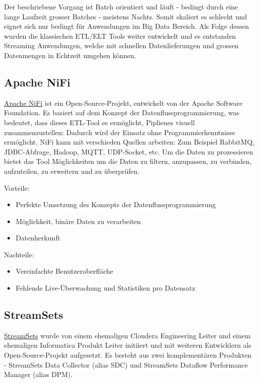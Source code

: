 Der beschriebene Vorgang ist Batch orientiert und l{\"a}uft - bedingt durch eine lange Laufzeit grosser Batches - meistens Nachts. Somit skaliert es schlecht und eignet sich nur bedingt f{\"u}r Anwendungen im Big Data Bereich. Als Folge dessen wurden die klassischen ETL/ELT Tools weiter entwickelt und es entstanden Streaming Anwendungen, welche mit schnellen Datenlieferungen und grossen Datenmengen in Echtzeit umgehen k{\"o}nnen.

\subsection{Apache NiFi}

\href{https://nifi.apache.org}{Apache NiFi} ist ein Open-Source-Projekt, entwickelt von der Apache Software Foundation. Es basiert auf dem Konzept der Datenflussprogrammierung, was bedeutet, dass dieses ETL-Tool es erm{\"o}glicht, Piplienes visuell zusammenzustellen: Dadurch wird der Einsatz ohne Programmierkenntnisse erm{\"o}glicht. NiFi kann mit verschieden Quellen arbeiten: Zum Beispiel RabbitMQ, JDBC-Abfrage, Hadoop, MQTT, UDP-Socket, etc. Um die Daten zu prozessieren bietet das Tool M{\"o}glichkeiten um die Daten zu filtern, anzupassen, zu verbinden, aufzuteilen, zu erweitern und zu {\"u}berpr{\"u}fen. 

Vorteile: 
\begin{itemize}
  \item Perfekte Umsetzung des Konzepts der Datenflussprogrammierung
  \item M{\"o}glichkeit, bin{\"a}re Daten zu verarbeiten
  \item Datenherkunft
\end{itemize}

Nachteile: 
\begin{itemize}
  \item Vereinfachte Benutzeroberfl{\"a}che 
  \item Fehlende Live-{\"U}berwachung und Statistiken pro Datensatz
\end{itemize}

\subsection{StreamSets}

\href{https://streamsets.com}{StreamSets} wurde von einem ehemaligen Cloudera Engineering Leiter und einem ehemaligen Informatica Produkt Leiter initiiert und mit weiteren Entwicklern als Open-Source-Projekt aufgesetzt. Es besteht aus zwei komplement{\"a}ren Produkten - StreamSets Data Collector (alias SDC) und StreamSets Dataflow Performance Manager (alias DPM).

